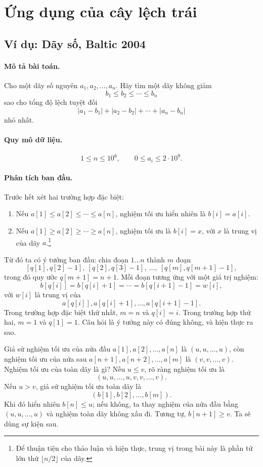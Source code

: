 \documentclass[11pt]{article}
\begin{document}
\section{Ứng dụng của cây lệch trái}

\subsection{Ví dụ: Dãy số, Baltic 2004}

\paragraph{Mô tả bài toán.}
Cho một dãy số nguyên \(a_1,a_2,\ldots,a_n\). Hãy tìm một dãy không giảm
\[
  b_1\le b_2\le\cdots\le b_n
\]
sao cho tổng độ lệch tuyệt đối
\[
  |a_1-b_1|+|a_2-b_2|+\cdots+|a_n-b_n|
\]
nhỏ nhất.

\paragraph{Quy mô dữ liệu.}
\[
  1\le n\le 10^6,\qquad 0\le a_i\le 2\cdot 10^9.
\]

\paragraph{Phân tích ban đầu.}
Trước hết xét hai trường hợp đặc biệt:
\begin{enumerate}
  \item Nếu \(a[1]\le a[2]\le\cdots\le a[n]\), nghiệm tối ưu hiển nhiên là
  \(b[i]=a[i]\).
  \item Nếu \(a[1]\ge a[2]\ge\cdots\ge a[n]\), nghiệm tối ưu là \(b[i]=x\), với
  \(x\) là trung vị của dãy \(a\).\footnote{Để thuận tiện cho thảo luận và hiện
  thực, trung vị trong bài này là phần tử lớn thứ \(\lfloor n/2\rfloor\) của
  dãy.}
\end{enumerate}

Từ đó ta có ý tưởng ban đầu: chia đoạn \(1\ldots n\) thành \(m\) đoạn
\[
  [q[1],q[2]-1],\ [q[2],q[3]-1],\ \ldots,\ [q[m],q[m+1]-1],
\]
trong đó quy ước \(q[m+1]=n+1\). Mỗi đoạn tương ứng với một giá trị nghiệm:
\[
  b[q[i]]=b[q[i]+1]=\cdots=b[q[i+1]-1]=w[i],
\]
với \(w[i]\) là trung vị của
\[
  a[q[i]],a[q[i]+1],\ldots,a[q[i+1]-1].
\]
Trong trường hợp đặc biệt thứ nhất, \(m=n\) và \(q[i]=i\). Trong trường hợp thứ
hai, \(m=1\) và \(q[1]=1\). Câu hỏi là ý tưởng này có đúng không, và hiện thực
ra sao.

Giả sử nghiệm tối ưu của nửa đầu \(a[1],a[2],\ldots,a[n]\) là
\((u,u,\ldots,u)\), còn nghiệm tối ưu của nửa sau
\(a[n+1],a[n+2],\ldots,a[m]\) là \((v,v,\ldots,v)\). Nghiệm tối ưu của toàn dãy
là gì? Nếu \(u\le v\), rõ ràng nghiệm tối ưu là
\[
  (u,u,\ldots,u,v,v,\ldots,v).
\]
Nếu \(u>v\), giả sử nghiệm tối ưu toàn dãy là
\[
  (b[1],b[2],\ldots,b[m]).
\]
Khi đó hiển nhiên \(b[n]\le u\); nếu không, ta thay nghiệm của nửa đầu bằng
\((u,u,\ldots,u)\) và nghiệm toàn dãy không xấu đi. Tương tự, \(b[n+1]\ge v\).
Ta sẽ dùng sự kiện sau.
\end{document}
